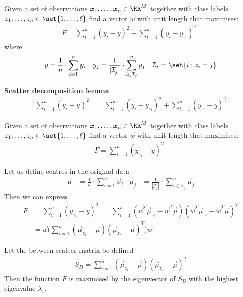 \documentclass[landscape,footrule]{foils}
\begin{document}

Given a set of observations $\vec{x}_1,\ldots,\vec{x}_n\in\RR^M$ together with class labels $z_1,\ldots,z_n\in\set{1,\ldots,\ell}$ find a vector $\vec{w}$ with unit length that maximises:
\begin{align*}
F=\sum_{i=1}^n(y_i-\bar{y})^2-\sum_{i=1}^n(y_i-\bar{y}_{z_i})^2\enspace
\end{align*}
where 
\begin{align*}
\bar{y}&=\frac{1}{n}\cdot\sum_{i=1}^n y_i &
\bar{y}_j&=\frac{1}{|\mathcal{I}_j|}\cdot\sum_{i\in\mathcal{I}_j}^n y_j& 
\mathcal{I}_j=\set{i: z_i=j}
\end{align*}


\textbf{Scatter decomposition lemma}
\begin{align*}
\sum_{i=1}^n (y_i-\bar{y})^2
&=\sum_{i=1}^n (y_i-\bar{y}_{z_i})^2 +\sum_{i=1}^n (\bar{y}_{z_i}-\bar{y})^2
\end{align*}


Given a set of observations $\vec{x}_1,\ldots,\vec{x}_n\in\RR^M$ together with class labels $z_1,\ldots,z_n\in\set{1,\ldots,\ell}$ find a vector $\vec{w}$ with unit length that maximises:
\begin{align*}
F=\sum_{i=1}^n(\bar{y}_{z_i}-\bar{y})^2\enspace
\end{align*}


Let us define centres in the original data 
\begin{align*}
\vec{\mu}&=\frac{1}{n}\cdot\sum_{i=1}^n \vec{x}_i &
\vec{\mu}_j&=\frac{1}{|\mathcal{I}_j|}\cdot\sum_{i\in\mathcal{I}_j}^n \vec{\mu}_j
\end{align*}
Then we can express
\begin{align*}
F&=\sum_{i=1}^n(\bar{y}_{z_i}-\bar{y})^2\enspace
=\sum_{i=1}^n(\vec{w}^T\vec{\mu}_{z_i}-\vec{w}^T\vec{\mu})(\vec{w}^T\vec{\mu}_{z_i}-\vec{w}^T\vec{\mu})^T\\
&=\vec{w}\Biggl(\sum_{i=1}^n(\vec{\mu}_{z_i}-\vec{\mu})(\vec{\mu}_{z_i}-\vec{\mu})^T\Biggr)\vec{w}
\end{align*}


Let the between scatter matrix be defined
\begin{align*}
S_B=\sum_{i=1}^n(\vec{\mu}_{z_i}-\vec{\mu})(\vec{\mu}_{z_i}-\vec{\mu})^T
\end{align*} 
Then the function $F$ is maximised by the eigenvector of $S_B$ with the highest eigenvalue $\lambda_1$.
\end{document}
